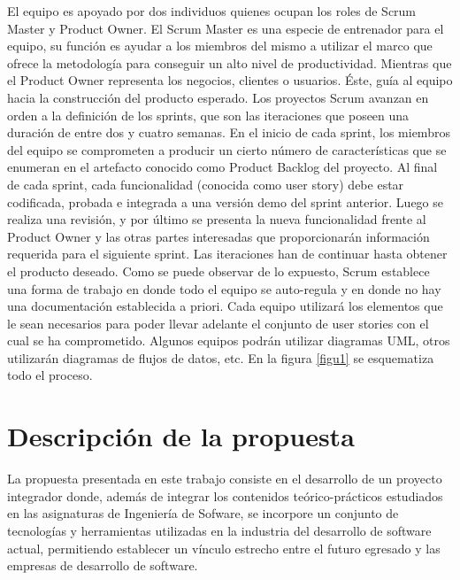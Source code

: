 El equipo es apoyado por dos individuos quienes ocupan los roles de Scrum Master y  Product Owner. 
El Scrum Master es una especie de entrenador para el equipo, su función es ayudar a los miembros del mismo a utilizar el marco que ofrece 
la metodología para conseguir un alto nivel de productividad. Mientras que el Product Owner representa los negocios, clientes o 
usuarios. Éste, guía al equipo hacia la construcción del producto esperado.
 Los proyectos Scrum avanzan en orden a la definición de los sprints, que son las iteraciones que poseen una duración de entre dos y cuatro semanas. 
En el inicio de cada sprint, los miembros del equipo se comprometen a producir un cierto número de características que se enumeran en 
el artefacto conocido como Product Backlog del proyecto.  Al final de cada sprint, cada funcionalidad (conocida como user story) debe estar 
codificada,
 probada e integrada a una versión demo del sprint anterior. Luego se realiza una revisión, y por último se presenta la nueva funcionalidad
 frente al Product Owner y las otras partes interesadas que proporcionarán información requerida para el siguiente sprint. 
Las iteraciones han de continuar hasta obtener el producto deseado.
Como se puede observar de lo expuesto, Scrum establece una forma de trabajo en donde todo el equipo se auto-regula y en donde no hay 
una documentación establecida a priori. Cada equipo utilizará los elementos que le sean necesarios para poder llevar adelante el conjunto de 
user stories
con el cual se ha comprometido. Algunos equipos podrán utilizar diagramas UML\cite{uml}, otros utilizarán diagramas de flujos de datos, etc.
En la figura \ref{figu1} se esquematiza todo el proceso.
\section{Descripción de la propuesta} \label{propuesta}

La propuesta presentada en este trabajo consiste 
en el desarrollo de un proyecto integrador donde, además de integrar los contenidos teórico-prácticos 
estudiados en las asignaturas de Ingeniería de Sofware, se incorpore un conjunto de tecnologías y herramientas utilizadas en la industria del 
desarrollo de software actual,
permitiendo
establecer un vínculo estrecho entre el futuro egresado y las empresas de desarrollo de software. \\
